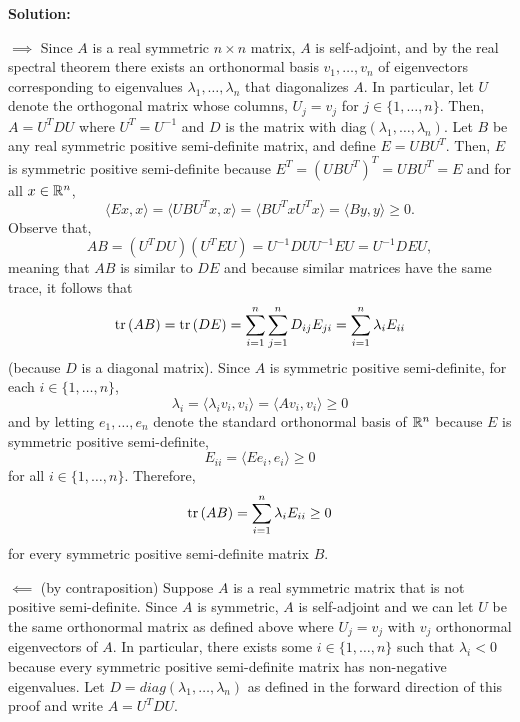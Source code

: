\documentclass{article}
\begin{document}
\textbf{Solution:}

$\implies$ Since $A$ is a real symmetric $n\times n$ matrix, $A$ is self-adjoint, and by the real spectral theorem there exists an orthonormal basis $v_1, \dots, v_n$ of eigenvectors corresponding to eigenvalues $\lambda_1, \dots, \lambda_n$ that diagonalizes $A$. In particular, let $U$ denote the orthogonal matrix whose columns, $U_j = v_j$ for $j\in\{1,\dots, n\}$. Then, $A = U^T D U$ where $U^T = U^{-1}$ and $D$ is the matrix with diag$(\lambda_1, \dots, \lambda_n)$. Let $B$ be any real symmetric positive semi-definite matrix, and define $E = UBU^T$. Then, $E$ is symmetric positive semi-definite because $E^T = (UBU^T)^T = UBU^T = E$ and for all $x\in \mathbb R^n$,
	\[\langle Ex, x\rangle = \langle U B U^Tx, x\rangle = \langle BU^Tx U^Tx \rangle = \langle By, y\rangle \geq 0.\]
Observe that,
	\[ AB = (U^T D U)(U^TEU) = U^{-1}DUU^{-1}EU = U^{-1}DEU, \]
meaning that $AB$ is similar to $DE$ and because similar matrices have the same trace, it follows that
	\[ \text{tr}\left({AB}\right) = \text{tr}\left({DE}\right) = \sum_{i = 1}^n \sum_{j=1}^n D_{ij} E_{ji} = \sum_{i=1}^n \lambda_i E_{ii}\]
(because $D$ is a diagonal matrix). Since $A$ is symmetric positive semi-definite, for each $i\in\{1, \dots, n\}$, 
	\[\lambda_i = \langle \lambda_i v_i, v_i\rangle = \langle Av_i, v_i\rangle \geq 0\]
and by letting $e_1, \dots, e_n$ denote the standard orthonormal basis of $\mathbb R^n$ because $E$ is symmetric positive semi-definite, 
	\[ E_{ii} = \langle Ee_i, e_i \rangle \geq 0\]
for all $i\in\{1,\dots, n\}$. Therefore, 
	\[ \text{tr}\left({AB}\right) = \sum_{i=1}^n \lambda_i E_{ii} \geq 0\]
for every symmetric positive semi-definite matrix $B$. 

$\impliedby$ (by contraposition) Suppose $A$ is a real symmetric matrix that is not positive semi-definite. Since $A$ is symmetric, $A$ is self-adjoint and we can let $U$ be the same orthonormal matrix as defined above where $U_j = v_j$ with $v_j$ orthonormal eigenvectors of $A$. In particular, there exists some $i\in \{1, \dots, n\}$ such that $\lambda_i < 0$ because every symmetric positive semi-definite matrix has non-negative eigenvalues. Let $D = diag(\lambda_1, \dots, \lambda_n)$ as defined in the forward direction of this proof and write $A = U^TDU$. 
\end{document}
